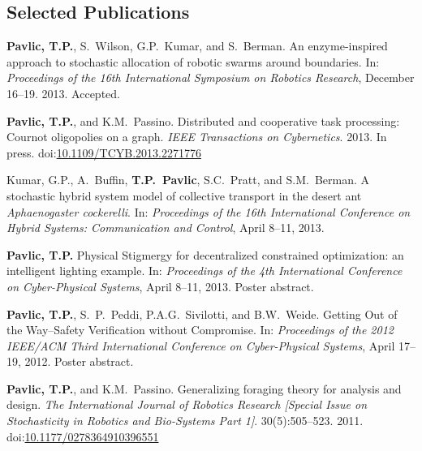 \documentclass[a4paper,11pt]{article}
\newcommand\doilink[1]{\href{http://dx.doi.org/#1}{#1}}
\newcommand\doi[1]{doi:\doilink{#1}}
\begin{document}
\subsection{Selected Publications}

\begin{bibenum}[itemsep=5pt]

    \item \textbf{Pavlic, T.P.}, S.~Wilson, G.P.~Kumar, and S.~Berman.
        An enzyme-inspired approach to stochastic allocation of robotic
        swarms around boundaries. In: \emph{Proceedings of the 16th
        International Symposium on Robotics Research},
        December 16--19. 2013. Accepted.

    \item \textbf{Pavlic, T.P.}, and K.M.~Passino. Distributed and
        cooperative task processing: Cournot oligopolies on a graph.
        \emph{IEEE Transactions on Cybernetics}. 2013. In press.
        \doi{10.1109/TCYB.2013.2271776}

    \item Kumar, G.P., A.~Buffin, \textbf{T.P.~Pavlic}, S.C.~Pratt, and
        S.M.~Berman. A stochastic hybrid system model of collective
        transport in the desert ant \emph{Aphaenogaster cockerelli}. In:
        \emph{Proceedings of the 16th International Conference on Hybrid
        Systems: Communication and Control}, April 8--11,
        2013.

    \item \textbf{Pavlic, T.P.} Physical Stigmergy for decentralized
        constrained optimization: an intelligent lighting example. In:
        \emph{Proceedings of the 4th International Conference on
        Cyber-Physical Systems}, April 8--11, 2013.
        Poster abstract.

    \item \textbf{Pavlic, T.P.}, S.~P.~Peddi, P.A.G.~Sivilotti, and B.W.~Weide.
        Getting Out of the Way--Safety Verification without Compromise.
        In: \emph{Proceedings of the 2012 IEEE/ACM Third International
        Conference on Cyber-Physical Systems}, April
        17--19, 2012. Poster abstract.

    \item \textbf{Pavlic, T.P.}, and K.M.~Passino. Generalizing foraging theory
        for analysis and design. \emph{The International Journal of
        Robotics Research [Special Issue on Stochasticity in Robotics
        and Bio-Systems Part 1]}. 30(5):505--523. 2011.
        \doi{10.1177/0278364910396551}


\end{bibenum}
\end{document}
